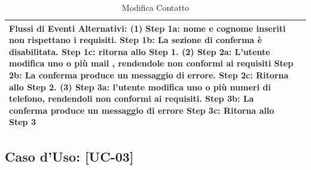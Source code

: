 \documentclass[a4paper,12pt]{article}
\begin{document}
\begin{table}[htbp]
\begin{tabularx}{\textwidth}{|p{}|X|}
{                \textbf{Flussi di Eventi Alternativi:} \newline \textbf{(1)} \newline Step 1a: nome e cognome inseriti non rispettano i requisiti. \newline Step 1b: La sezione di conferma è disabilitata. \newline Step 1c: ritorna allo Step 1. \newline \textbf{(2)} \newline Step 2a: L'utente modifica uno o più mail , rendendole non conformi ai requisiti \newline Step 2b: La conferma produce un messaggio di errore. \newline Step 2c: Ritorna allo Step 2. \newline \textbf{(3)} \newline Step 3a: l'utente modifica uno o più numeri di telefono, rendendoli non conformi ai requisiti. \newline Step 3b: La conferma produce un messaggio di errore \newline Step 3c: Ritorna allo Step 3
            } \\
            \hline
        \end{tabularx}
        \caption{Modifica Contatto}
    \end{table}
    \newpage
    \subsection*{Caso d'Uso: [UC-03]}
\end{document}

